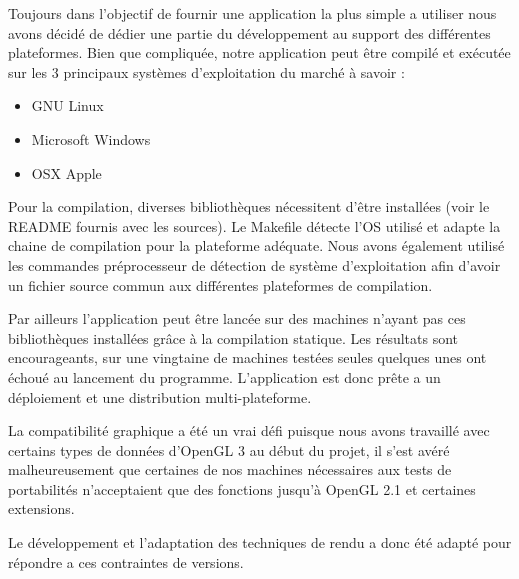 Toujours dans l’objectif de fournir une application la plus simple a utiliser nous avons décidé de dédier une partie du développement au support des différentes plateformes. Bien que compliquée, notre application peut être compilé et exécutée sur les 3 principaux systèmes d’exploitation du marché à savoir :

\begin{itemize}
 \item GNU Linux
 \item Microsoft Windows
 \item OSX Apple
\end{itemize}

Pour la compilation, diverses bibliothèques nécessitent d’être installées (voir le README fournis avec les sources). Le Makefile détecte l’OS utilisé et adapte la chaine de compilation pour la plateforme adéquate. Nous avons également utilisé les commandes préprocesseur de détection de système d’exploitation afin d’avoir un fichier source commun aux différentes plateformes de compilation.

Par ailleurs l’application peut être lancée sur des machines n’ayant pas ces bibliothèques installées grâce à la compilation statique. Les résultats sont encourageants, sur une vingtaine de machines testées seules quelques unes ont échoué au lancement du programme. L’application est donc prête a un déploiement et une distribution multi-plateforme.

La compatibilité graphique a été un vrai défi puisque nous avons travaillé avec certains types de données d’OpenGL 3 au début du projet, il s’est avéré malheureusement que certaines de nos machines nécessaires aux tests de portabilités n’acceptaient que des fonctions jusqu’à OpenGL 2.1 et certaines extensions.

Le développement et l’adaptation des techniques de rendu a donc été adapté pour répondre a ces contraintes de versions.
